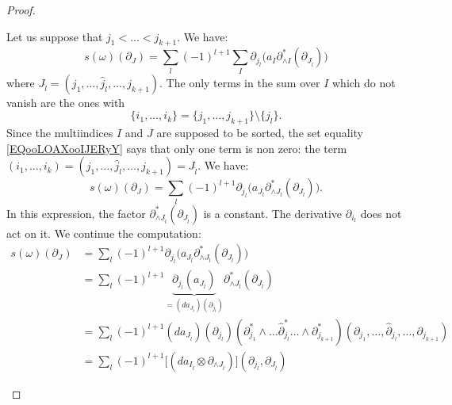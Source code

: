 \begin{proof}
\begin{subproof}
		\spitem[If \( J\) is sorted]
		Let us suppose that \( j_1<\ldots <j_{k+1}\). We have:
		\begin{equation}
			s(\omega)(\partial_J)=\sum_l(-1)^{l+1}\sum_I\partial_{j_l}\big( a_I\partial^*_{\wedge I}(\partial_{J_{\hat l}}) \big)
		\end{equation}
		where \( J_{\hat l}=(j_1,\ldots,\hat j_l,\ldots,j_{k+1})\). The only terms in the sum over \( I\) which do not vanish are the ones with
		\begin{equation}		\label{EQooLOAXooIJERyY}
			\{ i_1,\ldots,i_k \}=\{ j_1,\ldots,j_{k+1} \}\setminus\{ j_l \}.
		\end{equation}
		Since the multiindices \( I\) and \( J\) are supposed to be sorted, the set equality \eqref{EQooLOAXooIJERyY} says that only one term is non zero: the term \( (i_1,\ldots,i_k)=(j_1,\ldots,\hat j_l,\ldots,j_{k+1})=J_{\hat l}\). We have:
		\begin{equation}
			s(\omega)(\partial_J)=\sum_l(-1)^{l+1}\partial_{j_l}\big( a_{J_{\hat l}}\partial^*_{\wedge J_{\hat l}}(\partial_{J_{\hat l}}) \big).
		\end{equation}
		In this expression, the factor \( \partial^*_{\wedge J_{\hat l}}(\partial_{J_{\hat l}})\) is a constant. The derivative \( \partial_{i_l}\) does not act on it. We continue the computation:
		\begin{subequations}
			\begin{align}
				s(\omega)(\partial_J) & =\sum_l(-1)^{l+1}\partial_{j_l}\big( a_{J_{\hat l}}\partial^*_{\wedge J_{\hat l}}(\partial_{J_{\hat l}}) \big)                                                                                             \\
				                      & =\sum_l(-1)^{l+1}\underbrace{\partial_{j_l}(a_{J_{\hat l}})}_{=(da_{J_{\hat l}})(\partial_{j_l})}\partial^*_{\wedge J_{\hat l}}(\partial_{J_{\hat l}})                                                     \\
				                      & = \sum_l(-1)^{l+1}(da_{J_{\hat l}})(\partial_{j_l})(\partial^*_{j_1}\wedge\ldots\hat\partial^*_{j_l}\ldots\wedge \partial^*_{j_{k+1}})(\partial_{j_1},\ldots,\hat\partial_{j_l},\ldots,\partial_{j_{k+1}}) \\
				                      & =\sum_l(-1)^{l+1}\big[   (da_{I_{\hat l}}\otimes \partial_{\wedge J_{\hat l}})   \big](\partial_{j_l}, \partial_{J_{\hat l}})
			\end{align}
		\end{subequations}

\end{subproof}
\end{proof}
